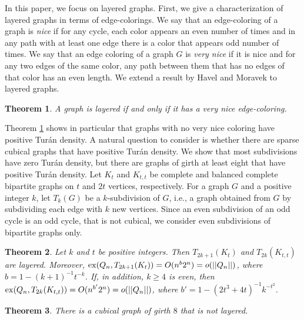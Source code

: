 \documentclass[11pt, a4paper]{article}
\newtheorem{theorem}{Theorem}
\newcommand{\ex}{{\rm  ex}}
\begin{document}
In this paper, we focus on layered graphs.  First, we  give a characterization of layered graphs in terms of edge-colorings. 
We say that an edge-coloring of a graph is {\it nice} if for any cycle, each color appears an even number of times and in any path with at least one edge there is a color that appears odd number of times. We say that an edge coloring of a graph $G$ is {\it very nice} if  it is nice and for any two edges of the same color, any path between them that has no edges of that color has an even length. We extend a result by Havel and Moravek \cite{HM} to layered graphs. 

\begin{theorem}\label{very-nice-intro}
A graph is layered if and only if it has a very nice edge-coloring. 
\end{theorem}





Theorem \ref{very-nice-intro}  shows in particular that graphs with no very nice coloring 
have positive Tur\'an density.   A natural question to consider is whether there are sparse cubical graphs that have positive Tur\'an density. We show that most subdivisions have zero Tur\'an density, but there are graphs of girth at least eight that have positive Tur\'an density.  Let $K_t$ and $K_{t,t}$ be complete and balanced complete bipartite graphs on $t$ and $2t$ vertices, respectively. For a graph $G$ and a positive integer $k$, let $T_k(G)$ be a $k$-subdivision of $G$, i.e., a graph obtained from $G$ by subdividing each edge with $k$ new vertices. Since an even subdivision of an odd cycle is an odd cycle, that is not cubical, we consider even subdivisions of bipartite graphs only. 


\begin{theorem}\label{subdivisions}
Let $k$ and $t$ be positive integers.
Then $T_{2k+1}(K_t)$ and $T_{2k}(K_{t,t})$ are  layered. Moreover, 
$\ex(Q_n, T_{2k+1}(K_t)) = O(n^b2^n)= o(||Q_n||)$, where $b=1-(k+1)^{-1}t^{-k}$.
If, in addition,  $k\geq 4$ is even,  then 
$\ex(Q_n, T_{2k}(K_{t,t})) = O( n^{b'}2^n) = o(||Q_n||)$, where $b'= 1 -(2t^3+4t)^{-1}k^{-t^2}$.
\end{theorem}	



\begin{theorem}\label{girth8}
There is a cubical graph of girth $8$ that is not layered. 
\end{theorem} 
\end{document}

